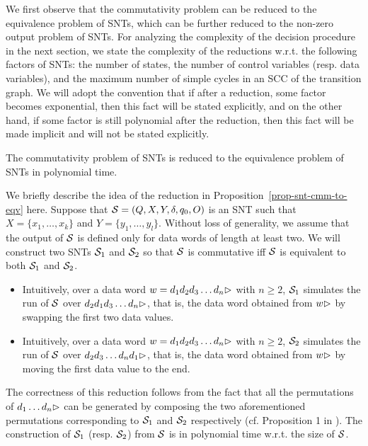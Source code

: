 We first observe that the commutativity problem can be reduced to the equivalence problem of SNTs, which can be further reduced to the non-zero output problem of SNTs. For analyzing the complexity of the decision procedure in the next section,  we state the complexity of the reductions w.r.t. the following factors of SNTs: the number of states, the number of control variables (resp. data variables), and the maximum number of simple cycles in an SCC of the transition graph. We will adopt the convention that if after a reduction, some factor becomes exponential, then this fact will be stated explicitly, and on the other hand, if some factor is still polynomial after the reduction, then this fact will be made implicit and will not be stated explicitly. 

\begin{proposition}\label{prop-snt-cmm-to-eqv}
The commutativity problem of SNTs is reduced to the equivalence problem of SNTs in polynomial time.
\end{proposition}

We briefly describe the idea of the reduction in Proposition~\ref{prop-snt-cmm-to-eqv} here. Suppose that ${\mathcal{S} }=(Q, X, Y, \delta, q_0, O)$ is an SNT such that $X=\{x_1,\dots,x_k\}$ and $Y=\{y_1,\dots,y_l\}$. Without loss of generality, we assume that the output of ${\mathcal{S} }$ is defined only for data words of length at least two. We will construct two SNTs ${\mathcal{S} }_1$ and ${\mathcal{S} }_2$ so that ${\mathcal{S} }$ is commutative iff ${\mathcal{S} }$ is equivalent to both ${\mathcal{S} }_1$ and ${\mathcal{S} }_2$.
\begin{itemize}
\item Intuitively, over a data word $w=d_1 d_2 d_3 \dots d_n\rhd$ with $n\ge 2$, ${\mathcal{S} }_1$ simulates the run of ${\mathcal{S} }$ over $d_2 d_1 d_3 \dots d_n\rhd$, that is, the data word obtained from $w\rhd$ by swapping the first two data values.
%
\item Intuitively, over a data word $w=d_1 d_2 d_3 \dots d_n\rhd$ with $n\ge 2$, ${\mathcal{S} }_2$ simulates the run of ${\mathcal{S} }$ over $d_2 d_3 \dots d_n d_1\rhd$, that is, the data word obtained from $w\rhd$ by moving the first data value to the end. 
\end{itemize}
The correctness of this reduction follows from the fact that all the permutations of $d_1\dots d_n\rhd$ can be generated by composing the two aforementioned permutations corresponding to ${\mathcal{S} }_1$ and ${\mathcal{S} }_2$ respectively (cf. Proposition 1 in \cite{CHSW15}). The construction of ${\mathcal{S} }_1$ (resp. ${\mathcal{S} }_2$) from ${\mathcal{S} }$ is in  polynomial time w.r.t. the size of ${\mathcal{S} }$.


